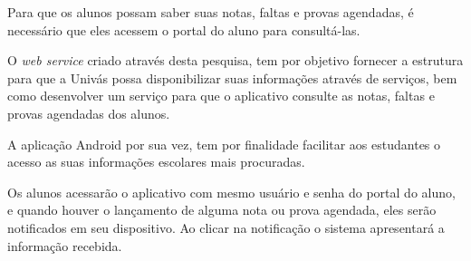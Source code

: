 
	\par Para que os alunos possam saber suas notas, faltas e provas agendadas,
é necessário que eles acessem o portal do aluno para consultá-las.

	\par O \textit{web service} criado através desta pesquisa, tem por objetivo
fornecer a estrutura para que a Univás possa disponibilizar suas informações
através de serviços, bem como desenvolver um serviço para que o aplicativo
consulte as notas, faltas e provas agendadas dos alunos.

	\par A aplicação Android por sua vez, tem por finalidade facilitar aos
estudantes o acesso as suas informações escolares mais procuradas.
	
	\par Os alunos acessarão o aplicativo com mesmo usuário e senha do
portal do aluno, e quando houver o lançamento de alguma nota ou prova agendada,
eles serão notificados em seu dispositivo. Ao clicar na notificação
o sistema apresentará a informação recebida. 